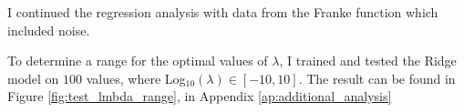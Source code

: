 I continued the regression analysis with data from the Franke function which included noise.

To determine a range for the optimal values of $\lambda$, I trained and tested the Ridge model on $100$ values, where Log$_{10}(\lambda) \in [-10, 10]$. The result can be found in Figure \ref{fig:test_lmbda_range}, in Appendix \ref{ap:additional_analysis}






















